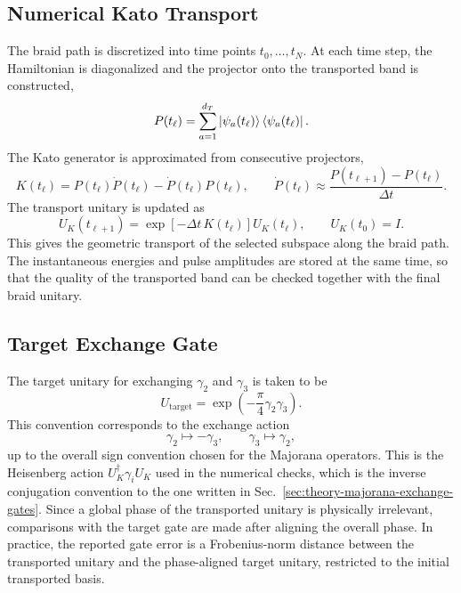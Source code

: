 \subsection{Numerical Kato Transport}
The braid path is discretized into time points $t_0,\ldots,t_N$. At each time step, the Hamiltonian is diagonalized and the projector onto the transported band is constructed,
\begin{equation}
P(t_\ell)
=
\sum_{a=1}^{d_T}
\ket{\psi_a(t_\ell)}\bra{\psi_a(t_\ell)} .
\end{equation}
The Kato generator is approximated from consecutive projectors,
\begin{equation}
K(t_\ell)
=
P(t_\ell)\dot{P}(t_\ell)
-
\dot{P}(t_\ell)P(t_\ell),
\qquad
\dot{P}(t_\ell)
\approx
\frac{P(t_{\ell+1})-P(t_\ell)}{\Delta t}.
\end{equation}
The transport unitary is updated as
\begin{equation}
U_K(t_{\ell+1})
=
\exp[-\Delta t\,K(t_\ell)]U_K(t_\ell),
\qquad
U_K(t_0)=I .
\label{eq:method_kato_update}
\end{equation}
This gives the geometric transport of the selected subspace along the braid path. The instantaneous energies and pulse amplitudes are stored at the same time, so that the quality of the transported band can be checked together with the final braid unitary.

\subsection{Target Exchange Gate}
The target unitary for exchanging $\gamma_2$ and $\gamma_3$ is taken to be
\begin{equation}
U_{\mathrm{target}}
=
\exp\left(
-\frac{\pi}{4}\gamma_2\gamma_3
\right).
\label{eq:method_target_exchange_gate}
\end{equation}
This convention corresponds to the exchange action
\begin{equation}
\gamma_2\mapsto -\gamma_3,
\qquad
\gamma_3\mapsto \gamma_2,
\end{equation}
up to the overall sign convention chosen for the Majorana operators. This is the Heisenberg action $U_K^\dagger\gamma_i U_K$ used in the numerical checks, which is the inverse conjugation convention to the one written in Sec.~\ref{sec:theory-majorana-exchange-gates}. Since a global phase of the transported unitary is physically irrelevant, comparisons with the target gate are made after aligning the overall phase. In practice, the reported gate error is a Frobenius-norm distance between the transported unitary and the phase-aligned target unitary, restricted to the initial transported basis.

